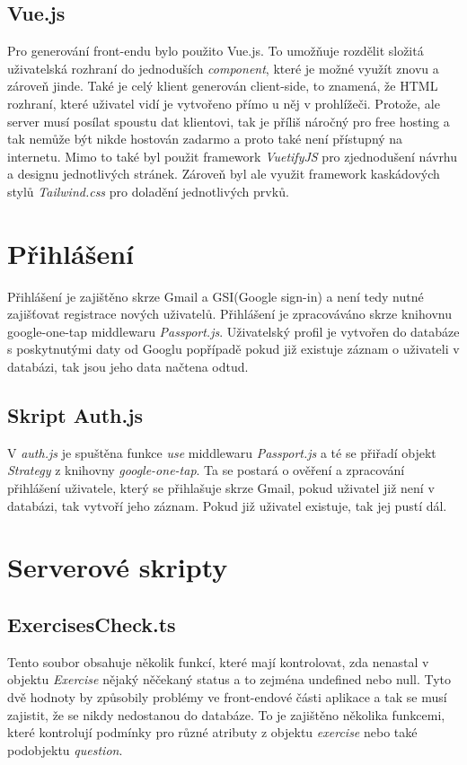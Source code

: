 \documentclass[12pt]{report}
\begin{document}
\subsection{Vue.js}
Pro generování front-endu bylo použito Vue.js. To umožňuje rozdělit složitá uživatelská rozhraní do jednoduších \emph{component}, které je možné využít znovu a zároveň jinde. Také je celý klient generován client-side, to znamená, že HTML rozhraní, které uživatel vidí je vytvořeno přímo u něj v prohlížeči. Protože, ale server musí posílat spoustu dat klientovi, tak je příliš náročný pro free hosting a tak nemůže být nikde hostován zadarmo a proto také není přístupný na internetu. Mimo to také byl použit framework  \emph{VuetifyJS} pro zjednodušení návrhu a designu jednotlivých stránek. Zároveň byl ale využit framework kaskádových stylů \emph{Tailwind.css} pro doladění jednotlivých prvků.

\section{Přihlášení}
Přihlášení je zajištěno skrze Gmail a GSI(Google sign-in) a není tedy nutné zajišťovat registrace nových uživatelů. Přihlášení je zpracováváno skrze knihovnu google-one-tap middlewaru \emph{Passport.js}. Uživatelský profil je vytvořen do databáze s poskytnutými daty od Googlu popřípadě pokud již existuje záznam o uživateli v databázi, tak jsou jeho data načtena odtud.

\subsection{Skript Auth.js}
V \emph{auth.js} je spuštěna funkce \emph{use} middlewaru \emph{Passport.js} a té se přiřadí objekt \emph{Strategy} z knihovny \emph{google-one-tap}. Ta se postará o ověření a zpracování přihlášení uživatele, který se přihlašuje skrze Gmail, pokud uživatel již není v databázi, tak vytvoří jeho záznam. Pokud již uživatel existuje, tak jej pustí dál.

\section{Serverové skripty}
\subsection{ExercisesCheck.ts}
Tento soubor obsahuje několik funkcí, které mají kontrolovat, zda nenastal v objektu \emph{Exercise} nějaký něčekaný status a to zejména undefined nebo null. Tyto dvě hodnoty by způsobily problémy ve front-endové části aplikace a tak se musí zajistit, že se nikdy nedostanou do databáze. To je zajištěno několika funkcemi, které kontrolují podmínky pro různé atributy z objektu \emph{exercise} nebo také podobjektu \emph{question}.
\end{document}
